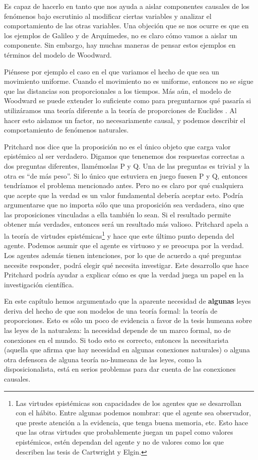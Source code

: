 Es capaz de hacerlo en tanto que nos ayuda a aislar componentes causales de los fenómenos bajo escrutinio al modificar ciertas variables y analizar el comportamiento de las otras variables. Una objeción que se nos ocurre es que en los ejemplos de Galileo y de Arquímedes, no es claro cómo vamos a aislar un componente. Sin embargo, hay muchas maneras de pensar estos ejemplos en términos del modelo de Woodward.

Piénsese por ejemplo el caso en el que variamos el hecho de que sea un movimiento uniforme. Cuando el movimiento no es uniforme, entonces no se sigue que las distancias son proporcionales a los tiempos. Más aún, el modelo de Woodward se puede extender lo suficiente como para preguntarnos qué pasaría si utilizáramos una teoría diferente a la teoría de proporciones de Euclides \cite{Woodward2018}. Al hacer esto aislamos un factor, no necesariamente causal, y podemos describir el comportamiento de fenómenos naturales.

Pritchard nos dice que la proposición no es el único objeto que carga valor epistémico al ser verdadero. Digamos que tenenemos dos respuestas correctas a dos preguntas diferentes, llamémoslas P y Q. Una de las preguntas es trivial y la otra es ``de más peso''. Si lo único que estuviera en juego fuesen P y Q, entonces tendríamos el problema mencionado antes. Pero no es claro por qué cualquiera que acepte que la verdad es un valor fundamental debería aceptar esto. Podría argumentarse que no importa sólo que una proposición sea verdadera, sino que las proposiciones vinculadas a ella también lo sean. Si el resultado permite obtener más verdades, entonces será un resultado más valioso. Pritchard apela a la teoría de virtudes epistémicas\footnote{Las virtudes epistémicas son capacidades de los agentes que se desarrollan con el hábito. Entre algunas podemos nombrar: que el agente sea observador, que preste atención a la evidencia, que tenga buena memoria, etc. Esto hace que las otras virtudes que probablemente juegan un papel como valores epistémicos, estén dependan del agente y no de valores como los que describen las tesis de Cartwright y Elgin.} y hace que este último punto dependa del agente. Podemos asumir que el agente es virtuoso y se preocupa por la verdad. Los agentes además tienen intenciones, por lo que de acuerdo a qué preguntas necesite responder, podrá elegir qué necesita investigar. Este desarrollo que hace Pritchard podría ayudar a explicar cómo es que la verdad juega un papel en la investigación científica.

En este capítulo hemos argumentado que la aparente necesidad de \textbf{algunas} leyes deriva del hecho de que son modelos de una teoría formal: la teoría de proporciones. Esto es sólo un poco de evidencia a favor de la tesis humeana sobre las leyes de la naturaleza: la necesidad depende de un marco formal, no de conexiones en el mundo. Si todo esto es correcto, entonces la necesitarista (aquella que afirma que hay necesidad en algunas conexiones naturales) o alguna otra defensora de alguna teoría no-humeana de las leyes, como la disposicionalista, está en serios problemas para dar cuenta de las conexiones causales.

